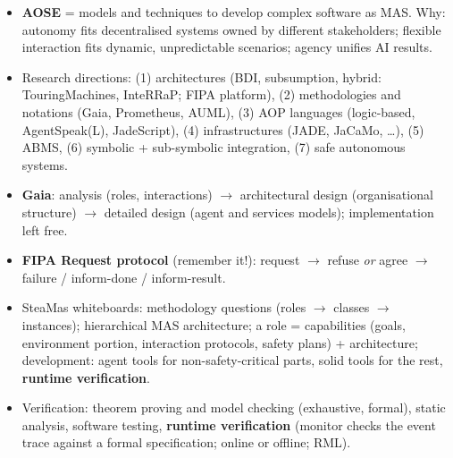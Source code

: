 \begin{nbsummary}
\begin{itemize}[nosep]
  \item \textbf{AOSE} = models and techniques to develop complex software as MAS. Why:
        autonomy fits decentralised systems owned by different stakeholders; flexible
        interaction fits dynamic, unpredictable scenarios; agency unifies AI results.
  \item Research directions: (1) architectures (BDI, subsumption, hybrid: TouringMachines,
        InteRRaP; FIPA platform), (2) methodologies and notations (Gaia, Prometheus,
        AUML), (3) AOP languages (logic-based, AgentSpeak(L), JadeScript),
        (4) infrastructures (JADE, JaCaMo, \ldots), (5) ABMS, (6) symbolic +
        sub-symbolic integration, (7) safe autonomous systems.
  \item \textbf{Gaia}: analysis (roles, interactions) $\to$ architectural design
        (organisational structure) $\to$ detailed design (agent and services models);
        implementation left free.
  \item \textbf{FIPA Request protocol} (remember it!): request $\to$ refuse \emph{or}
        agree $\to$ failure / inform-done / inform-result.
  \item SteaMas whiteboards: methodology questions (roles $\to$ classes $\to$ instances);
        hierarchical MAS architecture; a role = capabilities (goals, environment portion,
        interaction protocols, safety plans) + architecture; development: agent tools for
        non-safety-critical parts, solid tools for the rest, \textbf{runtime verification}.
  \item Verification: theorem proving and model checking (exhaustive, formal), static
        analysis, software testing, \textbf{runtime verification} (monitor checks the
        event trace against a formal specification; online or offline; RML).
\end{itemize}
\end{nbsummary}
